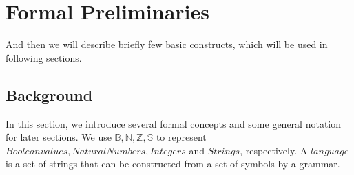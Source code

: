 \section{Formal Preliminaries}
\label{sec:preliminaries}
And then we will describe briefly few basic constructs, which will be used in following sections.
\subsection{Background}
\label{sec:background}
In this section, we introduce several formal concepts and some general notation for later sections. We use \(\mathbb B, \mathbb N, \mathbb Z, \mathbb S\) to represent \(Boolean values, Natural Numbers, Integers\)  and  \(Strings\), respectively. A \(language\) is a set of strings that can be constructed from a set of symbols by a grammar.

